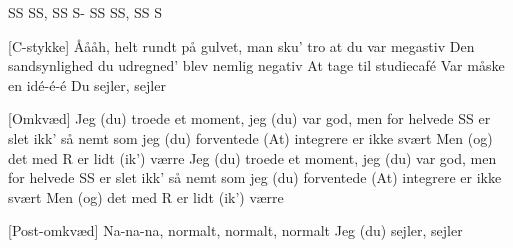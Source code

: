 \documentclass[a4paper,11pt]{article}
\begin{document}
\begin{song}
   SS SS, SS S-
SS SS, SS S

[C-stykke] Åååh, helt rundt på gulvet, man sku’ tro at du var megastiv
Den sandsynlighed du udregned’ blev nemlig negativ
At tage til studiecafé
Var måske en idé-é-é
Du sejler, sejler

[Omkvæd] Jeg (du) troede et moment, jeg (du) var god, men for helvede
SS er slet ikk’ så nemt som jeg (du) forventede
(At) integrere er ikke svært
Men (og) det med R er lidt (ik') værre
Jeg (du) troede et moment, jeg (du) var god, men for helvede
SS er slet ikk’ så nemt som jeg (du) forventede
(At) integrere er ikke svært
Men (og) det med R er lidt (ik') værre

[Post-omkvæd] Na-na-na, normalt, normalt, normalt
Jeg (du) sejler, sejler
\end{song}
\end{document}
